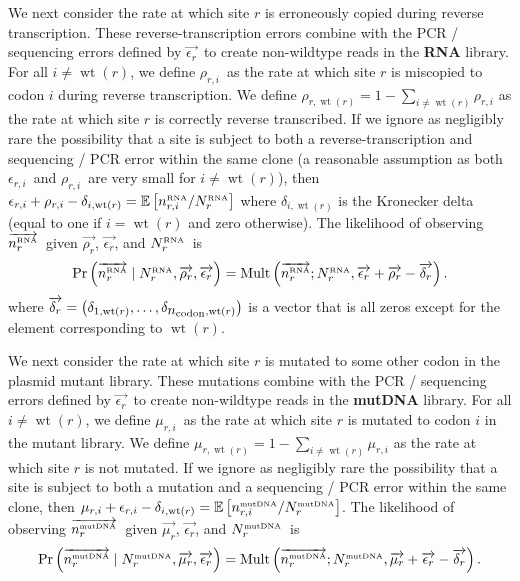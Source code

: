 \documentclass[12pt,draft]{article}
\DeclareMathOperator{\multinomial}{Mult}
\DeclareMathOperator{\wt}{wt}
\newcommand{\ncodon}{\mbox{$n_{\rm{codon}}$}}
\newcommand{\Nrmutdna}{\mbox{$N_r^{\rm \scriptscriptstyle mut DNA}$}}
\newcommand{\Nrrna}{\mbox{$N_r^{\rm \scriptscriptstyle RNA}$}}
\newcommand{\nrmutdnai}{\mbox{$n_{r, i}^{\rm \scriptscriptstyle mut DNA}$}}
\newcommand{\nrrnai}{\mbox{$n_{r, i}^{\rm \scriptscriptstyle  RNA}$}}
\newcommand{\nrmutdnavec}{\mbox{$\overrightarrow{n_{r}^{\rm \scriptscriptstyle mut DNA}}$}}
\newcommand{\nrrnavec}{\mbox{$\overrightarrow{n_{r}^{\rm \scriptscriptstyle  RNA}}$}}
\newcommand{\eri}{\mbox{$\epsilon_{r,i}$}}
\newcommand{\ervec}{\mbox{$\overrightarrow{\epsilon_{r}}$}}
\newcommand{\rri}{\mbox{$\rho_{r,i}$}}
\newcommand{\rrwtr}{\mbox{$\rho_{r,\wt\left(r\right)}$}}
\newcommand{\rrvec}{\mbox{$\overrightarrow{\rho_{r}}$}}
\newcommand{\mri}{\mbox{$\mu_{r,i}$}}
\newcommand{\mrwtr}{\mbox{$\mu_{r,\wt\left(r\right)}$}}
\newcommand{\mrvec}{\mbox{$\overrightarrow{\mu_{r}}$}}
\newcommand{\deltarvec}{\mbox{$\overrightarrow{\delta_r}$}}
\newcommand{\E}{\mbox{$\mathbb{E}$}}
\begin{document}
We next consider the rate at which site $r$ is erroneously copied during reverse transcription. These reverse-transcription errors combine with the PCR / sequencing errors defined by \ervec\ to create non-wildtype reads in the  {\bf RNA} library. For all $i \ne \wt\left(r\right)$, we define \rri\ as the rate at which site $r$ is miscopied to codon $i$ during reverse transcription. We define $\rrwtr = 1 - \sum\limits_{i \ne \wt\left(r\right)} \rri$ as the rate at which site $r$ is correctly reverse transcribed. If we ignore as negligibly rare the possibility that a site is subject to both a reverse-transcription and sequencing / PCR error within the same clone (a reasonable assumption as both \eri\ and \rri\ are very small for $i \ne \wt\left(r\right)$), then $\eri + \rri - \delta_{i,\wt\left(r\right)} = \E\left[\nrrnai / \Nrrna\right]$ where $\delta_{i,\wt\left(r\right)}$ is the Kronecker delta (equal to one if $i = \wt\left(r\right)$ and zero otherwise). The likelihood of observing \nrrnavec\ given \rrvec, \ervec, and \Nrrna\ is
\begin{equation}
\label{eq:nrrnaveclikelihood}
\Pr\left(\nrrnavec \mid \Nrrna, \rrvec, \ervec\right) = \multinomial\left(\nrrnavec; \Nrrna, \ervec + \rrvec - \deltarvec\right).
\end{equation}
where $\deltarvec = \left(\delta_{1,\wt\left(r\right)}, \ldots, \delta_{\ncodon,\wt\left(r\right)}\right)$ is a vector that is all zeros except for the element corresponding to $\wt\left(r\right)$.

We next consider the rate at which site $r$ is mutated to some other codon in the plasmid mutant library. These mutations combine with the PCR / sequencing errors defined by \ervec\ to create non-wildtype reads in the {\bf mutDNA} library. For all $i \ne \wt\left(r\right)$, we define \mri\ as the rate at which site $r$ is mutated to codon $i$ in the mutant library. We define $\mrwtr = 1 - \sum\limits_{i \ne \wt\left(r\right)} \mri$ as the rate at which site $r$ is not mutated. If we ignore as negligibly rare the possibility that a site is subject to both a mutation and a sequencing / PCR error within the same clone, then $\mri + \eri - \delta_{i,\wt\left(r\right)} = \E\left[\nrmutdnai / \Nrmutdna\right]$. The likelihood of observing \nrmutdnavec\ given \mrvec, \ervec, and \Nrmutdna\ is
\begin{equation}
\label{eq:nrmutdnaveclikelihood}
\Pr\left(\nrmutdnavec \mid \Nrmutdna, \mrvec, \ervec\right) = \multinomial\left(\nrmutdnavec; \Nrmutdna, \mrvec + \ervec - \deltarvec\right).
\end{equation}
\end{document}
